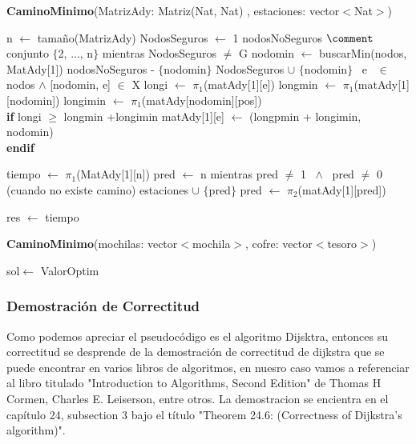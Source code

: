 \documentclass[spanish,12pt]{article}
\begin{document}
\begin{algorithm}[H]{\textbf{CaminoMinimo}(MatrizAdy: Matriz(Nat, Nat) , estaciones: vector$<$Nat$>$)}
	\begin{algorithmic}[1]
		
		\State n $\gets$ tamaño(MatrizAdy)
		\State NodosSeguros $\gets$ 1
		\State nodosNoSeguros $\comment$ conjunto $\{$2, ..., n$\}$
		\State mientras NodosSeguros $\neq$ G
		\State \quad nodomin $\gets$ buscarMin(nodos, MatAdy[1])
		\State \quad nodosNoSeguros - $\{$nodomin$\}$
		\State \quad NodosSeguros $\cup$ $\{$nodomin$\}$
		\State \quad \forall \ e \ $\in$ nodos $\land$ [nodomin, e] $\in$ X
		\State \qquad longi $\gets$ $\pi_{1}$(matAdy[1][e])
		\State \qquad longmin $\gets$ $\pi_{1}$(matAdy[1][nodomin])
		\State \qquad longimin $\gets$ $\pi_{1}$(matAdy[nodomin][pos])
\\
		\qquad \textbf{if} longi $\geq$ longmin +longimin
			\State \qquad \quad matAdy[1][e] $\gets$ (longpmin + longimin, nodomin)
\\		 
 \qquad \textbf{endif}

		\State tiempo $\gets$ $\pi_{1}$(MatAdy[1][n])
		\State pred $\gets$ n
		\State mientras pred $\neq$ 1 \ $\land$ \ pred $\neq$ 0 (cuando no existe camino)
		\State \quad estaciones $\cup$ $\{$pred$\}$
		\State \quad pred $\gets$ $\pi_{2}$(matAdy[1][pred])

		\State res $\gets$ tiempo
 	\end{algorithmic}
\end{algorithm}

\begin{algorithm}[H]{\textbf{CaminoMinimo}(mochilas: vector$<$mochila$>$, cofre: vector$<$tesoro$>$)}
	\begin{algorithmic}[1]
		
		\State sol$\gets$ ValorOptim
	\end{algorithmic}
\end{algorithm}

\newpage

\subsubsection{Demostración de Correctitud}
Como podemos apreciar el pseudocódigo es el algoritmo Dijsktra, entonces su correctitud se desprende de la demostración de correctitud de dijkstra que se puede encontrar en varios libros de algoritmos, en nuesro caso vamos a referenciar al libro titulado "Introduction to Algorithms, Second Edition" de Thomas H Cormen, Charles E. Leiserson, entre otros. La demostracion se encientra en el capítulo 24, subsection 3 bajo el título "Theorem 24.6: (Correctness of Dijkstra's algorithm)". 
\end{document}
